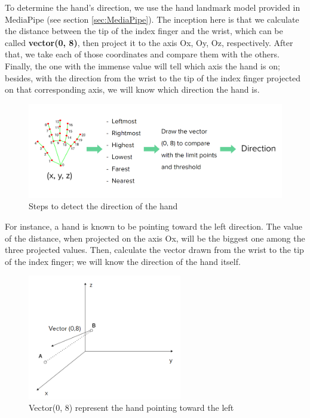 To determine the hand's direction, we use the hand landmark model provided in MediaPipe (see section \ref{sec:MediaPipe}). The inception here is that we calculate the distance between the tip of the index finger and the wrist, which can be called \textbf{vector(0, 8)}, then project it to the axis Ox, Oy, Oz, respectively. After that, we take each of those coordinates and compare them with the others. Finally, the one with the immense value will tell which axis the hand is on; besides, with the direction from the wrist to the tip of the index finger projected on that corresponding axis, we will know which direction the hand is.

\begin{figure}[H]
	\centering
	\includegraphics[width=\textwidth]{img/Chap4/DirectionSteps.png}
	\caption{Steps to detect the direction of the hand}
	\label{fig:Chap4-DirectionSteps}
\end{figure}

For instance, a hand is known to be pointing toward the left direction. The value of the distance, when projected on the axis Ox, will be the biggest one among the three projected values. Then, calculate the vector drawn from the wrist to the tip of the index finger; we will know the direction of the hand itself.

\begin{figure}[H]
	\centering
	\includegraphics[width=0.6\textwidth]{img/Chap4/vector0-8-forwardLeft.png}
	\caption{Vector(0, 8) represent the hand pointing toward the left}
	\label{fig:Chap4-vector0-8-forwardLeft}
\end{figure}

